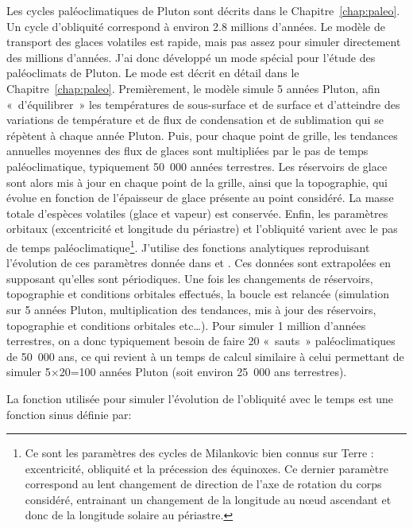 Les cycles paléoclimatiques de Pluton sont décrits dans le Chapitre~\ref{chap:paleo}. Un cycle d’obliquité correspond à environ 2.8 millions d’années. Le modèle de transport des glaces volatiles est rapide, mais pas assez pour simuler directement des millions d’années. J’ai donc développé un mode spécial pour l’étude des paléoclimats de Pluton. Le mode est décrit en détail dans le Chapitre~\ref{chap:paleo}. Premièrement, le modèle simule 5 années Pluton, afin «~d’équilibrer~» les températures de sous-surface et de surface et d’atteindre des variations de température et de flux de condensation et de sublimation qui se répètent à chaque année Pluton. Puis, pour chaque point de grille, les tendances annuelles moyennes des flux de glaces sont multipliées par le pas de temps paléoclimatique, typiquement 50~000 années terrestres. Les réservoirs de glace sont alors mis à jour en chaque point de la grille, ainsi que la topographie, qui évolue en fonction de l’épaisseur de glace présente au point considéré. 
La masse totale d'espèces volatiles (glace et vapeur) est conservée. Enfin, les paramètres orbitaux (excentricité et longitude du périastre) et l’obliquité varient avec le pas de temps paléoclimatique\footnote{Ce sont les paramètres des cycles de Milankovic bien connus sur Terre : excentricité, obliquité et la précession des équinoxes. Ce dernier paramètre correspond au lent changement de direction de l'axe de rotation du corps considéré, entrainant un changement de la longitude au nœud ascendant et donc de la longitude solaire au périastre.}. J'utilise des fonctions analytiques reproduisant l’évolution de ces paramètres donnée dans \citet{Earl:17} et \citet{Dobr:97}. Ces données sont extrapolées en supposant qu’elles sont périodiques. Une fois les changements de réservoirs, topographie et conditions orbitales effectués, la boucle est relancée (simulation sur 5 années Pluton, multiplication des tendances, mis à jour des réservoirs, topographie et conditions orbitales etc…). Pour simuler 1 million d’années terrestres, on a donc typiquement besoin de faire 20 «~sauts~» paléoclimatiques de 50~000 ans, ce qui revient à un temps de calcul similaire à celui permettant de simuler 5$\times$20=100 années Pluton (soit environ 25~000 ans terrestres). 

La fonction utilisée pour simuler l’évolution de l’obliquité avec le temps est une fonction sinus définie par:

